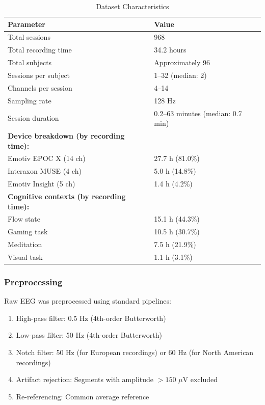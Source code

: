\documentclass[11pt,a4paper]{article}
\begin{document}
\begin{table}[H]
\centering
\caption{Dataset Characteristics}
\label{tab:dataset}
\begin{tabular}{@{}ll@{}}
\toprule
Parameter & Value \\
\midrule
Total sessions & 968 \\
Total recording time & 34.2 hours \\
Total subjects & Approximately 96 \\
Sessions per subject & 1--32 (median: 2) \\
Channels per session & 4--14 \\
Sampling rate & 128 Hz \\
Session duration & 0.2--63 minutes (median: 0.7 min) \\
\midrule
\textbf{Device breakdown (by recording time):} & \\
\quad Emotiv EPOC X (14 ch) & 27.7 h (81.0\%) \\
\quad Interaxon MUSE (4 ch) & 5.0 h (14.8\%) \\
\quad Emotiv Insight (5 ch) & 1.4 h (4.2\%) \\
\midrule
\textbf{Cognitive contexts (by recording time):} & \\
\quad Flow state & 15.1 h (44.3\%) \\
\quad Gaming task & 10.5 h (30.7\%) \\
\quad Meditation & 7.5 h (21.9\%) \\
\quad Visual task & 1.1 h (3.1\%) \\
\bottomrule
\end{tabular}
\end{table}

\subsubsection{Preprocessing}

Raw EEG was preprocessed using standard pipelines:

\begin{enumerate}
    \item High-pass filter: 0.5 Hz (4th-order Butterworth)
    \item Low-pass filter: 50 Hz (4th-order Butterworth)
    \item Notch filter: 50 Hz (for European recordings) or 60 Hz (for North American recordings)
    \item Artifact rejection: Segments with amplitude $>150$ $\mu$V excluded
    \item Re-referencing: Common average reference
\end{enumerate}
\end{document}
